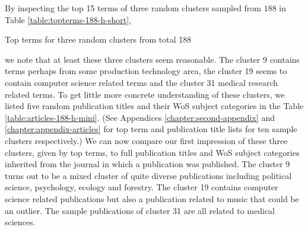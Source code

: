 By inspecting the top 15 terms of three random clusters sampled 
from $188$ in Table \ref{table:topterms-188-h-short},
\begin{table}[htp]
  \begin{center}
    
    \caption{Top terms for three random clusters from total 188}
    \label{table:topterms-188-h-short}    
 \end{center}
\end{table}
we note that at least these three clusters seem reasonable. The 
cluster 9 contains terms perhaps from some production technology
area, the cluster 19 seems to contain computer science related
terms and the cluster 31 medical research related terms.
To get little more concrete understanding of these clusters, we 
listed five random publication titles and their WoS subject 
categories in the Table \ref{table:articles-188-h-mini}. (See 
Appendices \ref{chapter:second-appendix} and 
\ref{chapter:appendix-articles} for top term and publication 
title lists for ten sample clusters respectively.)
We can now compare our first impression of these three clusters, 
given by top terms, to full publication titles and WoS subject 
categories inherited from the journal in which a publication was
published. The cluster 9 turns out to be a mixed cluster of quite
diverse publications including political science, psychology, 
ecology and forestry. The cluster 19 contains computer science 
related publications but also a publication related to music that 
could be an outlier. The sample publications of cluster 31 are all
related to medical sciences. 
\newpage


